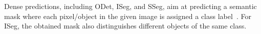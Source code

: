 Dense predictions, including ODet, ISeg, and SSeg, aim at predicting a semantic mask where each pixel/object in the given image is assigned a class label~\citep{ranftl2021vision,zhang2023cae,vandenhende2021multi}. For ISeg, the obtained mask also distinguishes different objects of the same class. 

